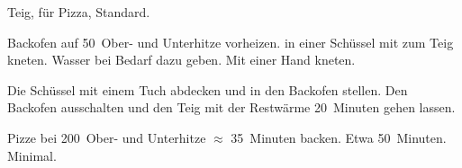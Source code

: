 \begin{recipe}{Teig, für Pizza, Standard.}
	\item[Vorbereitung] Backofen auf 50\textcelsius~Ober- und Unterhitze vorheizen.
	 in einer Schüssel mit
	 zum Teig kneten. 
	\hint Wasser bei Bedarf dazu geben. 
	\hint Mit einer Hand kneten.
	\item[Gehen lassen] Die Schüssel mit einem Tuch abdecken und in den Backofen stellen. Den Backofen ausschalten und den Teig mit der Restwärme 20~Minuten gehen lassen.
	\item[Pizza machen]
	\item[Backen] Pizze bei 200\textcelsius~Ober- und Unterhitze $\approx$ 35~Minuten backen.
	\preparationtime Etwa 50~Minuten.
	\washingup Minimal.
\end{recipe}

